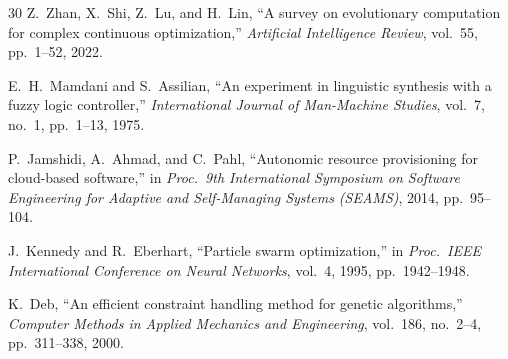 \documentclass[final,5p,times,twocolumn]{elsarticle}
\begin{document}
\begin{thebibliography}{30}
Z.~Zhan, X.~Shi, Z.~Lu, and H.~Lin, ``A survey on evolutionary computation for complex continuous optimization,'' \emph{Artificial Intelligence Review}, vol.~55, pp.~1--52, 2022.

E.~H.~Mamdani and S.~Assilian, ``An experiment in linguistic synthesis with a fuzzy logic controller,'' \emph{International Journal of Man-Machine Studies}, vol.~7, no.~1, pp.~1--13, 1975.

P.~Jamshidi, A.~Ahmad, and C.~Pahl, ``Autonomic resource provisioning for cloud-based software,'' in \emph{Proc.\ 9th International Symposium on Software Engineering for Adaptive and Self-Managing Systems (SEAMS)}, 2014, pp.~95--104.

J.~Kennedy and R.~Eberhart, ``Particle swarm optimization,'' in \emph{Proc.\ IEEE International Conference on Neural Networks}, vol.~4, 1995, pp.~1942--1948.

K.~Deb, ``An efficient constraint handling method for genetic algorithms,'' \emph{Computer Methods in Applied Mechanics and Engineering}, vol.~186, no.~2--4, pp.~311--338, 2000.

\end{thebibliography}
\end{document}
